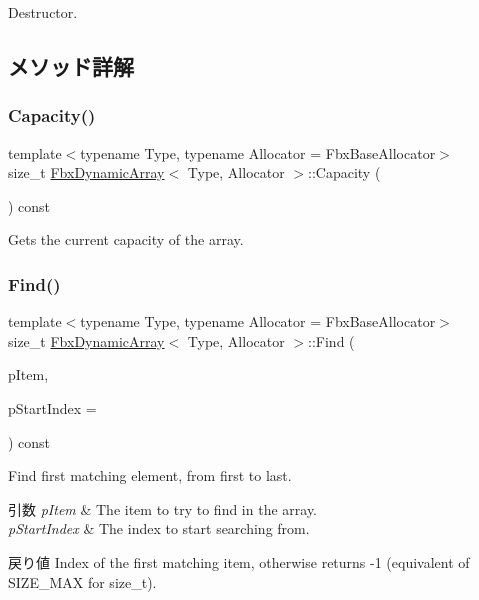 Destructor. 



\subsection{メソッド詳解}
\mbox{\label{class_fbx_dynamic_array_a148f92f13097c3dac6e947880fd978e5}} 
\subsubsection{\texorpdfstring{Capacity()}{Capacity()}}
{\footnotesize\ttfamily template$<$typename Type, typename Allocator = Fbx\+Base\+Allocator$>$ \\
size\+\_\+t \hyperlink{class_fbx_dynamic_array}{Fbx\+Dynamic\+Array}$<$ Type, Allocator $>$\+::Capacity (\begin{DoxyParamCaption}{ }\end{DoxyParamCaption}) const}



Gets the current capacity of the array. 

\mbox{\label{class_fbx_dynamic_array_a9fc0e6555886f0e38cd7f5027ed2b6a0}} 
\subsubsection{\texorpdfstring{Find()}{Find()}}
{\footnotesize\ttfamily template$<$typename Type, typename Allocator = Fbx\+Base\+Allocator$>$ \\
size\+\_\+t \hyperlink{class_fbx_dynamic_array}{Fbx\+Dynamic\+Array}$<$ Type, Allocator $>$\+::Find (\begin{DoxyParamCaption}\item[{const Type \&}]{p\+Item,  }\item[{const size\+\_\+t}]{p\+Start\+Index = {} }\end{DoxyParamCaption}) const}

Find first matching element, from first to last. 
\begin{DoxyParams}{引数}
{\em p\+Item} & The item to try to find in the array. \\
\hline
{\em p\+Start\+Index} & The index to start searching from. \\
\hline
\end{DoxyParams}
\begin{DoxyReturn}{戻り値}
Index of the first matching item, otherwise returns -\/1 (equivalent of S\+I\+Z\+E\+\_\+\+M\+AX for size\+\_\+t). 
\end{DoxyReturn}
\mbox{\label{class_fbx_dynamic_array_a7eb1f73c2cc10719d104e647dfc0bd39}} 
